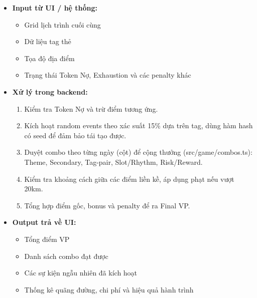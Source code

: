 \begin{itemize}[topsep=0pt, itemsep=2.5pt, leftmargin=1.5cm]
    \item \textbf{Input từ UI / hệ thống:}
    \begin{itemize}[topsep=0pt, itemsep=2pt]
        \item Grid lịch trình cuối cùng
        \item Dữ liệu tag thẻ
        \item Tọa độ địa điểm
        \item Trạng thái Token Nợ, Exhaustion và các penalty khác
    \end{itemize}

    \item \textbf{Xử lý trong backend:}
    \begin{enumerate}[topsep=0pt, itemsep=2pt]
        \item Kiểm tra Token Nợ và trừ điểm tương ứng.
        \item Kích hoạt random events theo xác suất 15\% dựa trên tag, dùng hàm hash có seed để đảm bảo tái tạo được.
        \item Duyệt combo theo từng ngày (cột) để cộng thưởng (src/game/combos.ts): Theme, Secondary, Tag-pair, Slot/Rhythm, Risk/Reward.
        \item Kiểm tra khoảng cách giữa các điểm liền kề, áp dụng phạt nếu vượt 20km.
        \item Tổng hợp điểm gốc, bonus và penalty để ra Final VP.
    \end{enumerate}

    \item \textbf{Output trả về UI:}
    \begin{itemize}[topsep=0pt, itemsep=2pt]
        \item Tổng điểm VP
        \item Danh sách combo đạt được
        \item Các sự kiện ngẫu nhiên đã kích hoạt
        \item Thống kê quãng đường, chi phí và hiệu quả hành trình
    \end{itemize}
\end{itemize}



